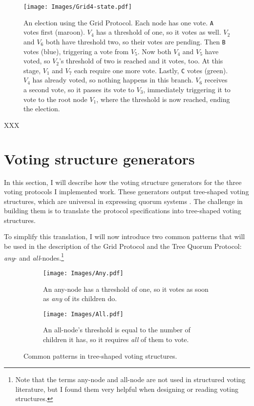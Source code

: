 \documentclass[draft,11pt,chapterprefix=true,toc=bibliography,numbers=noendperiod,
               footnotes=multiple,twoside]{scrreprt}
\begin{document}
\begin{figure}[p]
    \centering
    \texttt{[image: Images/Grid4-state.pdf]}
    \caption[An election using the Grid Protocol]{An election using the Grid Protocol. Each node has one vote. \texttt{A} votes first (maroon). \(V_4\) has a threshold of one, so it votes as well. \(V_2\) and \(V_6\) both have threshold two, so their votes are pending. Then \texttt{B} votes (blue), triggering a vote from \(V_5\). Now both \(V_4\) and \(V_5\) have voted, so \(V_2\)'s threshold of two is reached and it votes, too. At this stage, \(V_1\) and \(V_7\) each require one more vote. Lastly, \texttt{C} votes (green). \(V_4\) has already voted, so nothing happens in this branch. \(V_6\) receives a second vote, so it passes its vote to \(V_3\), immediately triggering it to vote to the root node \(V_1\), where the threshold is now reached, ending the election.}
    \label{fig:grid4-state}
\end{figure}

XXX

\section{Voting structure generators}

In this section, I will describe how the voting structure generators for the three voting protocols I implemented work. These generators output tree-shaped voting structures, which are universal in expressing quorum systems \autocite{structures}. The challenge in building them is to translate the protocol specifications into tree-shaped voting structures.

To simplify this translation, I will now introduce two common patterns that will be used in the description of the Grid Protocol and the Tree Quorum Protocol: \emph{any}- and \emph{all}-nodes.\footnote{Note that the terms any-node and all-node are not used in structured voting literature, but I found them very helpful when designing or reading voting structures.}

\begin{figure}[h]
    \centering
    \begin{subfigure}[t]{0.4\textwidth}
        \texttt{[image: Images/Any.pdf]}
        \caption{An any-node has a threshold of one, so it votes as soon as \emph{any} of its children do.}
        \label{fig:any}
    \end{subfigure}
    \quad
    \begin{subfigure}[t]{0.4\textwidth}
        \texttt{[image: Images/All.pdf]}
        \caption{An all-node's threshold is equal to the number of children it has, so it requires \emph{all} of them to vote.}
        \label{fig:all}
    \end{subfigure}
    \caption{Common patterns in tree-shaped voting structures.}
    \label{fig:tsvs-patterns}
\end{figure}
\end{document}
